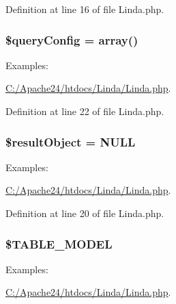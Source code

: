 Definition at line 16 of file Linda.\+php.

\hypertarget{class_linda_aea7d038e46660f55592569906cf09494}{}
\subsubsection[{\$query\+Config}]{\setlength{\rightskip}{0pt plus 5cm}\$query\+Config = array()\hspace{0.3cm}{\ttfamily [protected]}}\label{class_linda_aea7d038e46660f55592569906cf09494}
\begin{Desc}
\item[Examples\+: ]\par
\hyperlink{_c_1_2_apache24_2htdocs_2_linda_2_linda_8php-example}{C\+:/\+Apache24/htdocs/\+Linda/\+Linda.\+php}.\end{Desc}


Definition at line 22 of file Linda.\+php.

\hypertarget{class_linda_a64270a514fbca17fe7347df6320fc4ba}{}
\subsubsection[{\$result\+Object}]{\setlength{\rightskip}{0pt plus 5cm}\$result\+Object = N\+U\+L\+L\hspace{0.3cm}{\ttfamily [protected]}}\label{class_linda_a64270a514fbca17fe7347df6320fc4ba}
\begin{Desc}
\item[Examples\+: ]\par
\hyperlink{_c_1_2_apache24_2htdocs_2_linda_2_linda_8php-example}{C\+:/\+Apache24/htdocs/\+Linda/\+Linda.\+php}.\end{Desc}


Definition at line 20 of file Linda.\+php.

\hypertarget{class_linda_a486c281995ea6cdb9fb0367b6e260b76}{}
\subsubsection[{\$\+T\+A\+B\+L\+E\+\_\+\+M\+O\+D\+E\+L}]{\setlength{\rightskip}{0pt plus 5cm}\$T\+A\+B\+L\+E\+\_\+\+M\+O\+D\+E\+L\hspace{0.3cm}{\ttfamily [protected]}}\label{class_linda_a486c281995ea6cdb9fb0367b6e260b76}
\begin{Desc}
\item[Examples\+: ]\par
\hyperlink{_c_1_2_apache24_2htdocs_2_linda_2_linda_8php-example}{C\+:/\+Apache24/htdocs/\+Linda/\+Linda.\+php}.\end{Desc}


